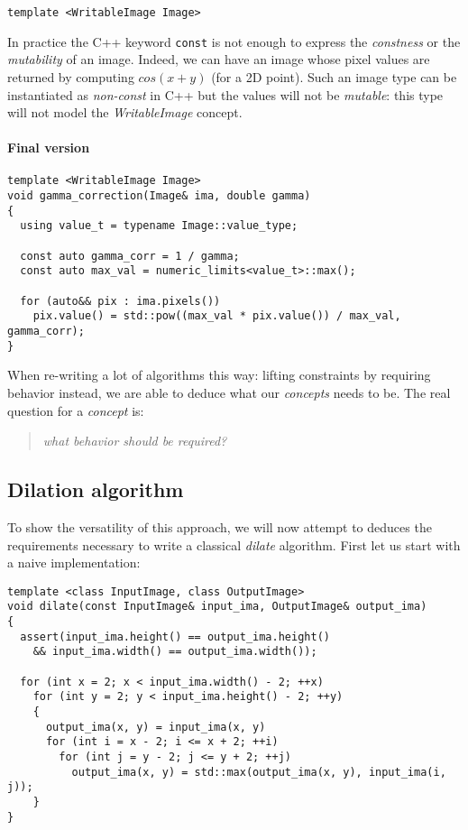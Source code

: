 \begin{verbatim}
template <WritableImage Image>
\end{verbatim}

\noindent In practice the C++ keyword \texttt{const} is not enough to express the \emph{constness} or the
\emph{mutability} of an image. Indeed, we can have an image whose pixel values are returned by computing $cos(x+y)$ (for
a 2D point). Such an image type can be instantiated as \emph{non-const} in C++ but the values will not be
\emph{mutable}: this type will not model the \emph{WritableImage} concept.



\paragraph{Final version}

\begin{verbatim}
template <WritableImage Image>
void gamma_correction(Image& ima, double gamma)
{
  using value_t = typename Image::value_type;

  const auto gamma_corr = 1 / gamma;
  const auto max_val = numeric_limits<value_t>::max();

  for (auto&& pix : ima.pixels())
    pix.value() = std::pow((max_val * pix.value()) / max_val, gamma_corr);
}
\end{verbatim}

\noindent When re-writing a lot of algorithms this way: lifting constraints by requiring behavior instead, we are able
to deduce what our \emph{concepts} needs to be. The real question for a \emph{concept} is: \blockquote{\emph{what
    behavior should be required?}}



\subsection{Dilation algorithm}
To show the versatility of this approach, we will now attempt to deduces the requirements necessary to write a classical
\emph{dilate} algorithm. First let us start with a naive implementation:

\begin{verbatim}
template <class InputImage, class OutputImage>
void dilate(const InputImage& input_ima, OutputImage& output_ima)
{
  assert(input_ima.height() == output_ima.height()
    && input_ima.width() == output_ima.width());

  for (int x = 2; x < input_ima.width() - 2; ++x)
    for (int y = 2; y < input_ima.height() - 2; ++y)
    {
      output_ima(x, y) = input_ima(x, y)
      for (int i = x - 2; i <= x + 2; ++i)
        for (int j = y - 2; j <= y + 2; ++j)
          output_ima(x, y) = std::max(output_ima(x, y), input_ima(i, j));
    }
}
\end{verbatim}

